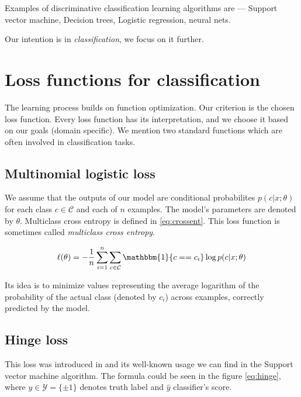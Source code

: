 Examples of discriminative classification learning algorithms are --- Support vector machine, Decision trees, Logistic regression, neural nets.

Our intention is in \emph{classification}, we focus on it further.


\section{Loss functions for classification}
The learning process builds on function optimization. Our criterion is the chosen loss function. Every loss function has its interpretation, and we choose it based on our goals (domain specific). We mention two standard functions which are often involved in classification tasks.

\subsection*{Multinomial logistic loss} 
We assume that the outputs of our model are conditional probabilites $p(c|x;\theta)$ for each class $c \in \mathcal{C}$ and each of $n$ examples. The model's parameters are denoted by $\theta$.
Multiclass cross entropy is defined in \ref{eq:crossent}. This loss function is sometimes called \emph{multiclass cross entropy}.

\begin{equation} \label{eq:crossent}
    \ell(\theta)=-\frac{1}{n}\sum_{i=1}^{n}\sum_{c \in \mathcal{C}}\mathbbm{1}\{c==c_i\}\log p(c|x;\theta)
\end{equation}

Its idea is to minimize values representing the average logarithm of the probability of the actual class (denoted by $c_i$) across examples, correctly predicted by the model. 


\subsection*{Hinge loss}
This loss was introduced in \cite{Gentile1998} and its well-known usage we can find in the Support vector machine algorithm. The formula could be seen in the figure \ref{eq:hinge}, where $y\in\mathcal{Y}=\{\pm1\}$ denotes truth label and $\hat{y}$ classifier's score.


